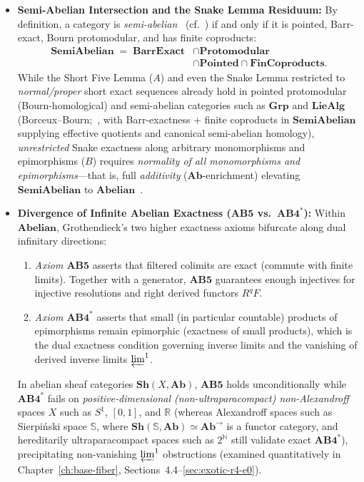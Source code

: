 \documentclass[10pt,twoside,openright]{book}
\theoremstyle{crmplain}
\theoremstyle{crmdef}
\theoremstyle{crmremark}
\begin{document}
\begin{itemize}[leftmargin=1.5em]
  \item \textbf{Semi-Abelian Intersection and the Snake Lemma Residuum:} By definition, a category is \emph{semi-abelian}~\cite{JMT02,Bourn91} (cf.~\cite[\S\S A1.3--A1.4]{Johnstone02}) if and only if it is pointed, Barr-exact, Bourn protomodular, and has finite coproducts:
  \[
    \begin{aligned}
      \mathbf{SemiAbelian} \;=\; \mathbf{BarrExact} &\cap \mathbf{Protomodular} \\
      &\cap \mathbf{Pointed} \cap \mathbf{FinCoproducts}.
    \end{aligned}
  \]
  While the Short Five Lemma ($A$) and even the Snake Lemma restricted to \emph{normal/proper} short exact sequences already hold in pointed protomodular (Bourn-homological) and semi-abelian categories such as $\mathbf{Grp}$ and $\mathbf{LieAlg}$ (Borceux--Bourn;~\cite{Bourn91,JMT02}, with Barr-exactness + finite coproducts in $\mathbf{SemiAbelian}$ supplying effective quotients and canonical semi-abelian homology), \emph{unrestricted} Snake exactness along arbitrary monomorphisms and epimorphisms ($B$) requires \emph{normality of all monomorphisms and epimorphisms}---that is, full \emph{additivity} ($\mathbf{Ab}$-enrichment) elevating $\mathbf{SemiAbelian}$ to $\mathbf{Abelian}$~\cite[Ch.~VIII]{MacLane98}.

  \item \textbf{Divergence of Infinite Abelian Exactness ($\mathbf{AB5}$ vs.\ $\mathbf{AB4}^*$):} Within $\mathbf{Abelian}$, Grothendieck's two higher exactness axioms bifurcate along dual infinitary directions:
  \begin{enumerate}[label=\textup{(\alph*)},leftmargin=1.6em]
    \item \emph{Axiom $\mathbf{AB5}$} asserts that filtered colimits are exact (commute with finite limits). Together with a generator, $\mathbf{AB5}$ guarantees enough injectives for injective resolutions and right derived functors $R^q F$.
    \item \emph{Axiom $\mathbf{AB4}^*$} asserts that small (in particular countable) products of epimorphisms remain epimorphic (exactness of small products), which is the dual exactness condition governing inverse limits and the vanishing of derived inverse limits $\varprojlim^1$.
  \end{enumerate}
  In abelian sheaf categories $\mathbf{Sh}(X, \mathbf{Ab})$, $\mathbf{AB5}$ holds unconditionally while $\mathbf{AB4}^*$ fails on \emph{positive-dimensional (non-ultraparacompact) non-Alexandroff} spaces $X$ such as $S^1$, $[0, 1]$, and $\mathbb{R}$ (whereas Alexandroff spaces such as Sierpi\'nski space $\mathbb{S}$, where $\mathbf{Sh}(\mathbb{S}, \mathbf{Ab}) \simeq \mathbf{Ab}^{\to}$ is a functor category, and hereditarily ultraparacompact spaces such as $2^{\mathbb{N}}$ still validate exact $\mathbf{AB4}^*$), precipitating non-vanishing $\varprojlim^1$ obstructions (examined quantitatively in Chapter~\ref{ch:base-fiber}, Sections~4.4--\ref{sec:exotic-r4-e0}).

\end{itemize}
\end{document}
